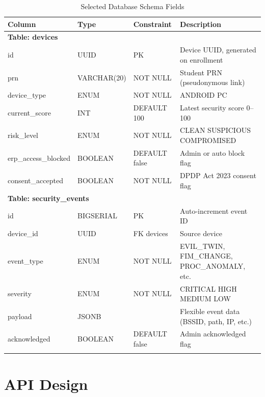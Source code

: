 \documentclass[12pt,a4paper]{report}
\begin{document}
\begin{longtable}{@{}p{3.5cm}p{3cm}p{2cm}p{5cm}@{}}
  \toprule
  \textbf{Column} & \textbf{Type} & \textbf{Constraint} & \textbf{Description} \\
  \midrule
  \multicolumn{4}{l}{\textbf{Table: devices}} \\
  \midrule
  id              & UUID          & PK          & Device UUID, generated on enrollment \\
  prn             & VARCHAR(20)   & NOT NULL    & Student PRN (pseudonymous link) \\
  device\_type    & ENUM          & NOT NULL    & ANDROID \textbar{} PC \\
  current\_score  & INT           & DEFAULT 100 & Latest security score 0--100 \\
  risk\_level     & ENUM          & NOT NULL    & CLEAN \textbar{} SUSPICIOUS \textbar{} COMPROMISED \\
  erp\_access\_blocked & BOOLEAN & DEFAULT false & Admin or auto block flag \\
  consent\_accepted & BOOLEAN    & NOT NULL    & DPDP Act 2023 consent flag \\
  \midrule
  \multicolumn{4}{l}{\textbf{Table: security\_events}} \\
  \midrule
  id              & BIGSERIAL     & PK          & Auto-increment event ID \\
  device\_id      & UUID          & FK devices  & Source device \\
  event\_type     & ENUM          & NOT NULL    & EVIL\_TWIN, FIM\_CHANGE, PROC\_ANOMALY, etc. \\
  severity        & ENUM          & NOT NULL    & CRITICAL \textbar{} HIGH \textbar{} MEDIUM \textbar{} LOW \\
  payload         & JSONB         &             & Flexible event data (BSSID, path, IP, etc.) \\
  acknowledged    & BOOLEAN       & DEFAULT false & Admin acknowledged flag \\
  \bottomrule
  \caption{Selected Database Schema Fields}
\end{longtable}

\chapter{API Design}
\end{document}
